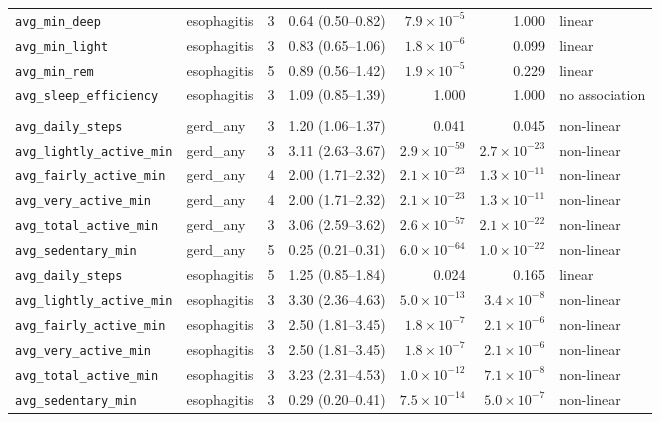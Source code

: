 \documentclass[11pt]{article}
\newcommand{\code}[1]{\texttt{\small #1}}
\begin{document}
\begin{longtable}{@{}p{3.3cm}p{1.7cm}c p{2.1cm} r r p{1.6cm}@{}}
\code{avg\_min\_deep} & esophagitis & 3 & 0.64 (0.50--0.82) & $7.9\times10^{-5}$ & 1.000 & linear \\
\code{avg\_min\_light} & esophagitis & 3 & 0.83 (0.65--1.06) & $1.8\times10^{-6}$ & 0.099 & linear \\
\code{avg\_min\_rem} & esophagitis & 5 & 0.89 (0.56--1.42) & $1.9\times10^{-5}$ & 0.229 & linear \\
\code{avg\_sleep\_efficiency} & esophagitis & 3 & 1.09 (0.85--1.39) & 1.000 & 1.000 & no association \\
\addlinespace
\multicolumn{7}{@{}l@{}}{\itshape Activity cohort --- 12 fits, EPV 6.8--30.4} \\
\code{avg\_daily\_steps} & gerd\_any & 3 & 1.20 (1.06--1.37) & 0.041 & 0.045 & non-linear \\
\code{avg\_lightly\_active\_min} & gerd\_any & 3 & 3.11 (2.63--3.67) & $2.9\times10^{-59}$ & $2.7\times10^{-23}$ & non-linear \\
\code{avg\_fairly\_active\_min} & gerd\_any & 4 & 2.00 (1.71--2.32) & $2.1\times10^{-23}$ & $1.3\times10^{-11}$ & non-linear \\
\code{avg\_very\_active\_min} & gerd\_any & 4 & 2.00 (1.71--2.32) & $2.1\times10^{-23}$ & $1.3\times10^{-11}$ & non-linear \\
\code{avg\_total\_active\_min} & gerd\_any & 3 & 3.06 (2.59--3.62) & $2.6\times10^{-57}$ & $2.1\times10^{-22}$ & non-linear \\
\code{avg\_sedentary\_min} & gerd\_any & 5 & 0.25 (0.21--0.31) & $6.0\times10^{-64}$ & $1.0\times10^{-22}$ & non-linear \\
\code{avg\_daily\_steps} & esophagitis & 5 & 1.25 (0.85--1.84) & 0.024 & 0.165 & linear \\
\code{avg\_lightly\_active\_min} & esophagitis & 3 & 3.30 (2.36--4.63) & $5.0\times10^{-13}$ & $3.4\times10^{-8}$ & non-linear \\
\code{avg\_fairly\_active\_min} & esophagitis & 3 & 2.50 (1.81--3.45) & $1.8\times10^{-7}$ & $2.1\times10^{-6}$ & non-linear \\
\code{avg\_very\_active\_min} & esophagitis & 3 & 2.50 (1.81--3.45) & $1.8\times10^{-7}$ & $2.1\times10^{-6}$ & non-linear \\
\code{avg\_total\_active\_min} & esophagitis & 3 & 3.23 (2.31--4.53) & $1.0\times10^{-12}$ & $7.1\times10^{-8}$ & non-linear \\
\code{avg\_sedentary\_min} & esophagitis & 3 & 0.29 (0.20--0.41) & $7.5\times10^{-14}$ & $5.0\times10^{-7}$ & non-linear \\

\end{longtable}
\end{document}
